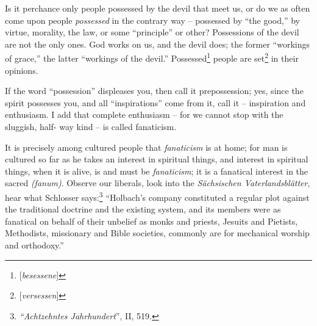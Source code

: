 \documentclass[12pt,a4paper]{book}
\begin{document}
Is it perchance only people possessed by the devil that meet us, or do we as 
often come upon people \textit{possessed} in the contrary way -- possessed by 
``the good,'' by virtue, morality, the law, or some ``principle'' or 
other? Possessions of the devil are not the only ones. God works on us, and 
the devil does; the former ``workings of grace,'' the latter ``workings of 
the devil.'' Possessed\footnote{[\textit{besessene}]} people are 
set\footnote{[\textit{versessen}]} in their opinions.

If the word ``possession'' displeases you, then call it prepossession; yes, 
since the spirit possesses you, and all ``inspirations'' come from it, call 
it -- inspiration and enthusiasm. I add that complete enthusiasm -- for we 
cannot stop with the sluggish, half- way kind -- is called fanaticism.

It is precisely among cultured people that \textit{fanaticism} is at home; for 
man is cultured so far as he takes an interest in spiritual things, and 
interest in spiritual things, when it is alive, is and must be 
\textit{fanaticism}; it is a fanatical interest in the sacred 
\textit{(fanum)}. Observe our liberals, look into the \textit{S\"achsischen 
Vaterlandsbl\"atter}, hear what Schlosser 
says:\footnote{\textit{``Achtzehntes Jahrhundert}'', II, 519.} ``Holbach's 
company constituted a regular plot against the traditional doctrine and the 
existing system, and its members were as fanatical on behalf of their unbelief 
as monks and priests, Jesuits and Pietists, Methodists, missionary and Bible 
societies, commonly are for mechanical worship and orthodoxy.''
\end{document}
